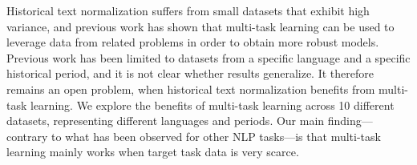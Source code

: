Historical text normalization suffers from small datasets that exhibit high variance, and previous work has shown that multi-task learning can be used to leverage data from related problems in order to obtain more robust models. Previous work has been limited to datasets from a specific language and a specific historical period, and it is not clear whether results generalize. It therefore remains an open problem, when historical text normalization benefits from multi-task learning. We explore the benefits of multi-task learning across 10 different datasets, representing different languages and periods. Our main finding---contrary to what has been observed for other NLP tasks---is that multi-task learning mainly works when target task data is very scarce.
